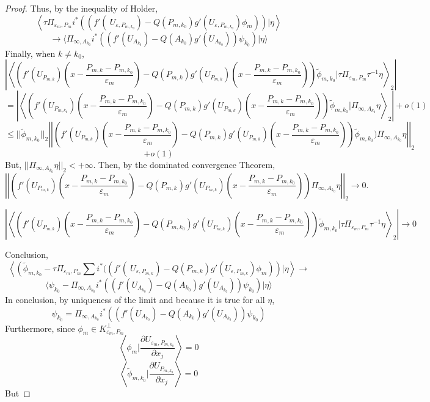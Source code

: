 \documentclass[10pt,a4paper]{amsart}
\renewcommand{\epsilon}{\varepsilon}
\begin{document}
\begin{proof}
Thus, by the inequality of Holder, 
$$\left\langle \tau \Pi_{\epsilon_m,P_m}i^*((f'(\ U_{\epsilon,P_{m,{k_0}}})-Q(P_{m,{k_0}})g'( U_{\epsilon,P_{m,{k_0}}}){\phi}_{m}))|\eta\right\rangle$$$$\rightarrow \langle\Pi_{\infty,A_{k_0}} i^*((f'(U_{A_{k_0}})-Q(A_{k_0})g'(U_{A_{k_0}}))\psi_{k_0})|\eta \rangle $$
Finally, when $k\ne k_0$,
$$\left|\left\langle  \left(f'( U_{P_{m,k}})\left(x-\frac{P_{m,k}-P_{m,{k_0}}}{\epsilon_m}\right)-Q(P_{m,k})g'( U_{P_{m,k}})\left(x-\frac{P_{m,k}-P_{m,{k_0}}}{\epsilon_m}\right)\right)\tilde{\phi}_{m,{k_0}}|\tau\Pi_{\epsilon_m,P_m}\tau^{-1}\eta\right\rangle_2\right|$$
$$=\left|\left\langle  \left(f'( U_{P_{m,{k_0}}})\left(x-\frac{P_{m,k}-P_{m,{k_0}}}{\epsilon_m}\right)-Q(P_{m,{k}})g'( U_{P_{m,k}})\left(x-\frac{P_{m,k}-P_{m,{k_0}}}{\epsilon_m}\right)\right)\tilde{\phi}_{m,{k_0}}|\Pi_{\infty,A_{k_0}}\eta\right\rangle_2\right|+o(1)$$
$$\leq ||\tilde{\phi}_{m,{k_0}}||_2\left|\left| \left(f'( U_{P_{m,k}})\left(x-\frac{P_{m,k}-P_{m,{k_0}}}{\epsilon_m}\right)-Q(P_{m,k})g'( U_{P_{m,k}})\left(x-\frac{P_{m,k}-P_{m,{k_0}}}{\epsilon_m}\right)\right)\tilde{\phi}_{m,{k_0}})\Pi_{\infty,A_{k_0}}\eta\right|\right|_2 $$$$+o(1) $$
But, $||\Pi_{\infty,A_{k_0}}\eta||_2<+\infty $. Then, by the dominated convergence Theorem,
$$\left|\left| \left(f'( U_{P_{m,{k}}})\left(x-\frac{P_{m,k}-P_{m,{k_0}}}{\epsilon_m}\right)-Q(P_{m,k})g'( U_{P_{m,k}})\left(x-\frac{P_{m,k}-P_{m,{k_0}}}{\epsilon_m}\right)\right)\Pi_{\infty,A_{k_0}}\eta\right|\right|_2 \rightarrow 0.$$

$$\left|\left\langle  \left(f'( U_{P_{m,k}})\left(x-\frac{P_{m,k}-P_{m,{k_0}}}{\epsilon_m}\right)-Q(P_{m,{k_0}})g'( U_{P_{m,k}})\left(x-\frac{P_{m,{k}}-P_{m,{k_0}}}{\epsilon_m}\right)\right)\tilde{\phi}_{m,{k_0}}|\tau\Pi_{\epsilon_m,P_m}\tau^{-1}\eta\right\rangle_2\right|\rightarrow0$$

Conclusion, 
$$\left\langle\left(\tilde{\phi}_{m,{k_0}} -\tau\Pi_{\epsilon_m,P_m}\sum i^*((f'(\ U_{\epsilon,P_{m,k}})-Q(P_{m,k})g'( U_{\epsilon,P_{m,k}}){\phi}_{m})\right)|\eta\right\rangle \rightarrow $$$$\langle \psi_{k_0} -\Pi_{\infty,A_{k_0}} i^*((f'(U_{A_{k_0}})-Q(A_{k_0})g'(U_{A_{k_0}}))\psi_{k_0})|\eta\rangle$$
In conclusion, by uniqueness of the limit and because it is true for all $\eta$,
$$\psi_{k_0} = \Pi_{\infty,A_{k_0}}i^*((f'(U_{A_{k_0}})-Q(A_{k_0})g'(U_{A_{k_0}}))\psi_{k_0}) $$
Furthermore, since $\phi_m \in K_{\epsilon_m,P_m}^\perp$
$$\left\langle \phi_{m}\big| \frac{\partial U_{\epsilon_m,P_{m,k_0}}}{\partial x_j}\right\rangle=0$$
$$\left\langle \tilde{\phi}_{m,{k_0}}\big| \frac{\partial U_{P_{m,k_0}}}{\partial x_j}\right\rangle=0$$
But 


\end{proof}
\end{document}
